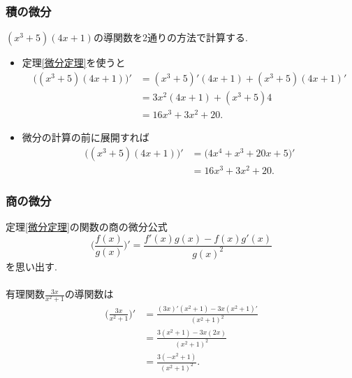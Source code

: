 \documentclass[dvipdfmx,cjk,10.2pt]{beamer}
\theoremstyle{definition}
\begin{document}


\begin{frame}
\frametitle{積の微分}

$(x^3+5)(4x+1)$の導関数を2通りの方法で計算する. 

\begin{itemize}
\item 定理\ref{微分定理}を使うと
\begin{align*}
\big((x^3+5)(4x+1)\big)'&=(x^3+5)'(4x+1)+(x^3+5)(4x+1)' \\
&= 3x^2(4x+1)+(x^3+5)4 \\
&= 16x^3+3x^2+20. 
\end{align*}
\item 微分の計算の前に展開すれば
\begin{align*}
\big((x^3+5)(4x+1)\big)'&= \big(4x^4+x^3+20x+5\big)' \\
&= 16x^3+3x^2+20. 
\end{align*}
\end{itemize}

\end{frame}





\begin{frame}
\frametitle{商の微分}

定理\ref{微分定理}の関数の商の微分公式
$$
\Big(\frac{f(x)}{g(x)}\Big)'=\frac{f'(x)g(x)-f(x)g'(x)}{g(x)^2}
$$
を思い出す. \\
\ \\

有理関数$\frac{3x}{x^2+1}$の導関数は
\begin{align*}
\Big(\frac{3x}{x^2+1}\Big)' &= \frac{(3x)'(x^2+1)-3x(x^2+1)'}{(x^2+1)^2} \\
& = \frac{3(x^2+1)-3x(2x)}{(x^2+1)^2} \\
&=  \frac{3(-x^2+1)}{(x^2+1)^2}. 
\end{align*}


\end{frame}


\end{document}
